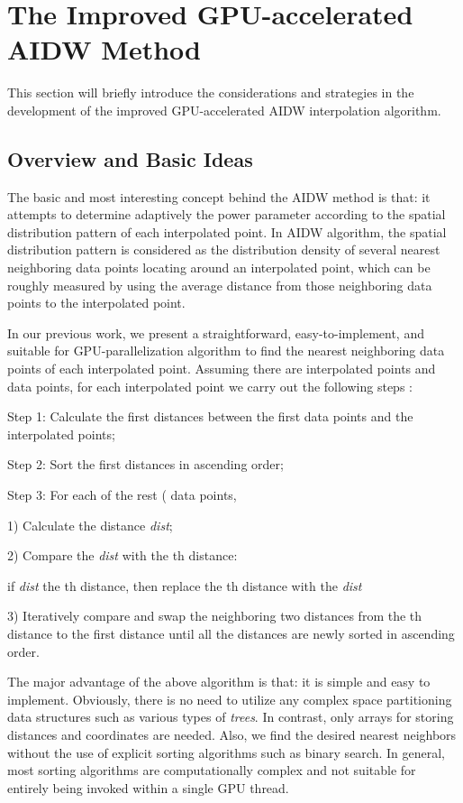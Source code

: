 \documentclass[final,5p,times,twocolumn,authoryear]{elsarticle}
\begin{document}
			\section{The Improved GPU-accelerated AIDW Method}
			This section will briefly introduce the considerations and strategies in the 
			development of the improved GPU-accelerated AIDW interpolation algorithm.
			
			\subsection{Overview and Basic Ideas}
			The basic and most interesting concept behind the AIDW method is that: it 
			attempts to determine adaptively the power parameter according to the 
			spatial distribution pattern of each interpolated point. In AIDW algorithm, 
			the spatial distribution pattern is considered as the distribution density 
			of several nearest neighboring data points locating around an interpolated 
			point, which can be roughly measured by using the average distance from 
			those neighboring data points to the interpolated point.
			
			In our previous work, we present a straightforward, easy-to-implement, and 
			suitable for GPU-parallelization algorithm to find the  nearest neighboring 
			data points of each interpolated point. Assuming there are  interpolated 
			points and  data points, for each interpolated point we carry out the 
			following steps \citep{29DBLP:journals/corr/MeiXX15}:
			
			Step 1: Calculate the first  distances between the first  data points and 
			the interpolated points; 
			
			Step 2: Sort the first  distances in ascending order; 
			
			Step 3: For each of the rest ( data points, 
			
			1) Calculate the distance \textit{dist};
			
			2) Compare the \textit{dist} with the th distance:
			
			if \textit{dist}  the th distance, then replace the th distance with the \textit{dist}
			
			3) Iteratively compare and swap the neighboring two distances from the th 
			distance to the first distance until all the  distances are newly sorted in 
			ascending order.
			
			The major advantage of the above algorithm is that: it is simple and easy to 
			implement. Obviously, there is no need to utilize any complex space 
			partitioning data structures such as various types of \textit{trees}. In contrast, only 
			arrays for storing distances and coordinates are needed. Also, we find the 
			desired nearest neighbors without the use of explicit sorting algorithms 
			such as binary search. In general, most sorting algorithms are 
			computationally complex and not suitable for entirely being invoked within a 
			single GPU thread. 
			
\end{document}
